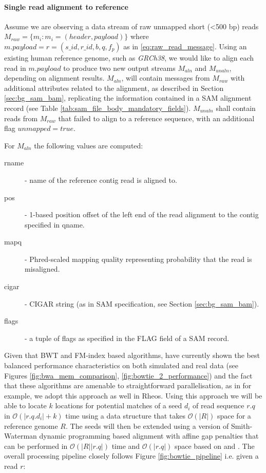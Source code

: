 \paragraph{Single read alignment to reference} 
Assume we are observing a data stream of raw unmapped short (<500 bp) reads $M_{raw} = \{m_i: m_i = (header, payload)\}$ where $m.payload = r = (s\_id, r\_id, b, q, f_p)$ as in \ref{eq:raw_read_message}. Using an existing human reference genome, such as \emph{GRCh38}, we would like to align each read in $m.payload$ to produce two new output streams $M_{aln}$ and $M_{unaln}$, depending on alignment results. $M_{aln}$, will contain messages from $M_{raw}$ with additional attributes related to the alignment, as described in Section \ref{sec:bg_sam_bam}, replicating the information contained in a SAM alignment record (see Table \ref{tab:sam_file_body_mandatory_fields}). $M_{unaln}$ shall contain reads from $M_{raw}$ that failed to align to a reference sequence, with an additional flag $unmapped=true$.

For $M_{aln}$ the following values are computed:

\begin{description}
    \item [rname] - name of the reference contig read is aligned to.
    \item [pos] - 1-based position offset of the left end of the read alignment to the contig specified in qname.
    \item [mapq] - Phred-scaled mapping quality representing probability that the read is misaligned.
    \item [cigar] - CIGAR string (as in SAM specification, see Section \ref{sec:bg_sam_bam}).
    \item [flags] - a tuple of flags as specified in the FLAG field of a SAM record.
\end{description}

Given that BWT and FM-index based algorithms\autocite{langmead2012fast},\autocite{li2013aligning} have currently shown the best balanced performance characteristics on both simulated and real data (see Figures \ref{fig:bwa_mem_comparison}, \ref{fig:bowtie_2_performance}) and the fact that these algorithms are amenable to straightforward parallelisation, as in \autocite{langmead2009searching} for example, we adopt this approach as well in Rheos. Using this approach we will be able to locate $k$ locations for potential matches of a seed $d_i$ of read sequence $r.q$ in $\mathcal{O}(|r.q.d_i| + k)$ time using a data structure that takes $\mathcal{O}(|R|)$ space for a reference genome $R$. The seeds will then be extended using a version of Smith-Waterman\autocite{smith1981comparison} dynamic programming based alignment with affine gap penalties that can be performed in $\mathcal{O}(|R||r.q|)$ time and $\mathcal{O}(|r.q|)$ space based on \autocite{myers1988optimal} and \autocite{farrar2006striped}. The overall processing pipeline closely follows Figure \ref{fig:bowtie_pipeline} i.e. given a read $r$: 

